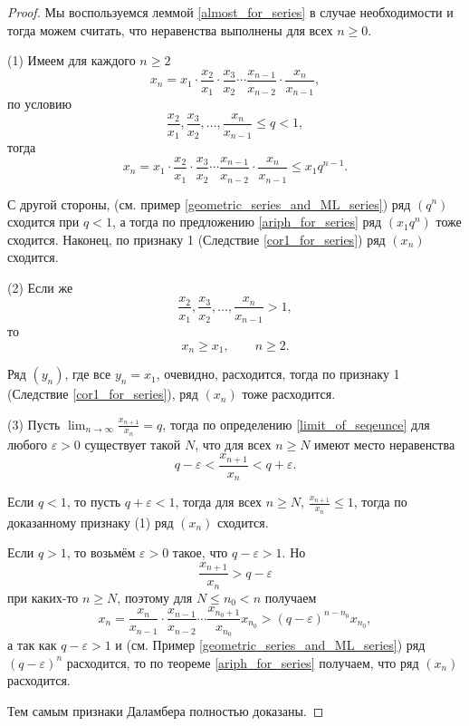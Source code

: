 \begin{proof} Мы воспользуемся леммой \ref{almost_for_series} в случае необходимости и тогда можем считать, что неравенства выполнены для всех $n \ge 0.$

    (1) Имеем для каждого $n \ge 2$
    \[
     x_n = x_1 \cdot \frac{x_2}{x_1}\cdot \frac{x_3}{x_2} \cdots \frac{x_{n-1}}{x_{n-2}}\cdot \frac{x_n}{x_{n-1}},
    \]
    по условию
    \[
     \frac{x_2}{x_1}, \frac{x_3}{x_2}, \ldots, \frac{x_n}{x_{n-1}} \le q < 1,
    \]
    тогда
    \[
     x_n = x_1 \cdot \frac{x_2}{x_1}\cdot \frac{x_3}{x_2} \cdots \frac{x_{n-1}}{x_{n-2}}\cdot \frac{x_n}{x_{n-1}} \le x_1 q^{n-1}.
    \]

С другой стороны, (см. пример \ref{geometric_series_and_ML_series}) ряд $(q^n)$ сходится при $q<1$, а тогда по предложению \ref{ariph_for_series} ряд $(x_1q^n)$ тоже сходится. Наконец, по признаку 1 (Следствие \ref{cor1_for_series}) ряд $(x_n)$ сходится.

(2) Если же 
\[
     \frac{x_2}{x_1}, \frac{x_3}{x_2}, \ldots, \frac{x_n}{x_{n-1}} > 1,
    \]
    то
    \[
     x_n \ge x_1, \qquad n \ge 2.
    \]

Ряд $(y_n)$, где все $y_n = x_1$, очевидно, расходится, тогда по признаку 1 (Следствие \ref{cor1_for_series}), ряд $(x_n)$ тоже расходится.

(3) Пусть $\lim_{n \to \infty} \frac{x_{n+1}}{x_n}= q$, тогда по определению \ref{limit_of_seqeunce} для любого $\varepsilon >0$ существует такой $N$, что для всех $n \ge N$ имеют место неравенства
\[
 q - \varepsilon < \frac{x_{n+1}}{x_n} < q + \varepsilon.
\]

Если $q<1$, то пусть $q+\varepsilon <1$, тогда для всех $n \ge N$, $\frac{x_{n+1}}{x_n} \le 1$, тогда по доказанному признаку (1) ряд $(x_n)$ сходится.

Если $q>1$, то возьмём $\varepsilon >0$ такое, что $q-\varepsilon >1$. Но
\[
 \frac{x_{n+1}}{x_n} > q - \varepsilon
\]
при каких-то $n \ge N$, поэтому для $N\le n_0 < n$ получаем
\[
 x_n=  \frac{x_n}{x_{n-1}} \cdot \frac{x_{n-1}}{x_{n-2}} \cdots \frac{x_{n_0 +1}}{x_{n_0}} x_{n_0} > (q-\varepsilon)^{n-n_0} x_{n_0},
\]
а так как $q - \varepsilon >1$ и (см. Пример \ref{geometric_series_and_ML_series}) ряд $(q-\varepsilon)^{n}$ расходится, то по теореме \ref{ariph_for_series} получаем, что ряд $(x_n)$ расходится.

Тем самым признаки Даламбера полностью доказаны.
\end{proof}


